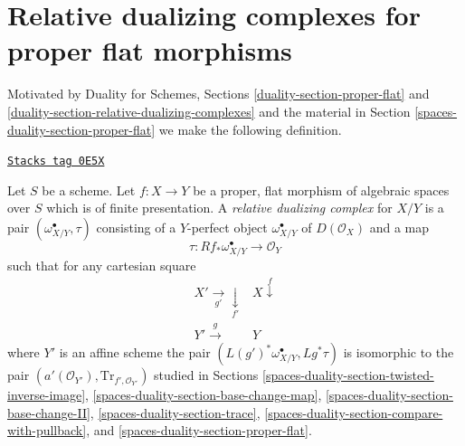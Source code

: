 \section{Relative dualizing complexes for proper flat morphisms}
\label{spaces-duality-section-relative-dualizing-proper-flat}
Motivated by Duality for Schemes, Sections
\ref{duality-section-proper-flat} and
\ref{duality-section-relative-dualizing-complexes}
and the material in
Section \ref{spaces-duality-section-proper-flat}
we make the following definition.

\begin{definition}
\label{spaces-duality-definition-relative-dualizing-proper-flat}
\href{https://stacks.math.columbia.edu/tag/0E5X}{\texttt{Stacks tag 0E5X}}

Let $S$ be a scheme. Let $f : X \to Y$ be a proper, flat morphism
of algebraic spaces over $S$ which is of finite presentation.
A {\it relative dualizing complex} for $X/Y$ is a pair
$(\omega_{X/Y}^\bullet, \tau)$ consisting of a
$Y$-perfect object $\omega_{X/Y}^\bullet$ of $D(\mathcal{O}_X)$
and a map
$$
\tau : Rf_*\omega_{X/Y}^\bullet \longrightarrow \mathcal{O}_Y
$$
such that for any cartesian square
$$
\begin{array}{cc}X' \underset{g'}{\longrightarrow}\underset{f'}{\downarrow} & X \overset{f}{\downarrow} \\ Y' \overset{g}{\longrightarrow} & Y\end{array}
$$
where $Y'$ is an affine scheme the pair
$(L(g')^*\omega_{X/Y}^\bullet, Lg^*\tau)$
is isomorphic to the pair
$(a'(\mathcal{O}_{Y'}), \text{Tr}_{f', \mathcal{O}_{Y'}})$
studied in Sections
\ref{spaces-duality-section-twisted-inverse-image},
\ref{spaces-duality-section-base-change-map},
\ref{spaces-duality-section-base-change-II},
\ref{spaces-duality-section-trace},
\ref{spaces-duality-section-compare-with-pullback}, and
\ref{spaces-duality-section-proper-flat}.
\end{definition}

